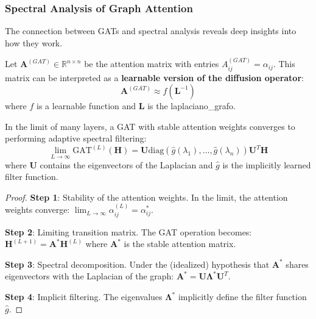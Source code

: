 \subsubsection{Spectral Analysis of Graph Attention}\label{subsubsec:analisis_espectral_gat}

The connection between GATs and spectral analysis reveals deep insights into how they work.

\begin{definition}\label{def:spectral_interpretation_attention}
Let $\mathbf{A}^{(GAT)} \in \mathbb{R}^{n \times n}$ be the attention matrix with entries $A^{(GAT)}_{ij} = \alpha_{ij}$. This matrix can be interpreted as a \textbf{learnable version of the diffusion operator}:
\begin{equation}
    \mathbf{A}^{(GAT)} \approx f(\mathbf{L}^{-1})
    \label{eq:gat_spectral_approximation}
\end{equation}
where $f$ is a learnable function and $\mathbf{L}$ is the \gls{laplaciano_grafo}.
\end{definition}

\begin{theorem}\label{thm:gat_spectral_connection}
In the limit of many layers, a \gls{GAT} with stable attention weights converges to performing adaptive spectral filtering:
\begin{equation}
    \lim_{L \to \infty} \text{GAT}^{(L)}(\mathbf{H}) = \mathbf{U} \text{diag}(\hat{g}(\lambda_1), \ldots, \hat{g}(\lambda_n)) \mathbf{U}^T \mathbf{H}
    \label{eq:gat_spectral_limit}
\end{equation}
where $\mathbf{U}$ contains the eigenvectors of the Laplacian and $\hat{g}$ is the implicitly learned filter function.
\end{theorem}

\begin{proof}
\textbf{Step 1}: Stability of the attention weights.
In the limit, the attention weights converge: $\lim_{L \to \infty} \alpha_{ij}^{(L)} = \alpha_{ij}^*$.

\textbf{Step 2}: Limiting transition matrix.
The \gls{GAT} operation becomes: $\mathbf{H}^{(L+1)} = \mathbf{A}^* \mathbf{H}^{(L)}$ where $\mathbf{A}^*$ is the stable attention matrix.

\textbf{Step 3}: Spectral decomposition.
Under the (idealized) hypothesis that $\mathbf{A}^*$ shares eigenvectors with the Laplacian of the graph: $\mathbf{A}^* = \mathbf{U} \mathbf{\Lambda}^* \mathbf{U}^T$.

\textbf{Step 4}: Implicit filtering.
The eigenvalues $\mathbf{\Lambda}^*$ implicitly define the filter function $\hat{g}$.
\end{proof}

